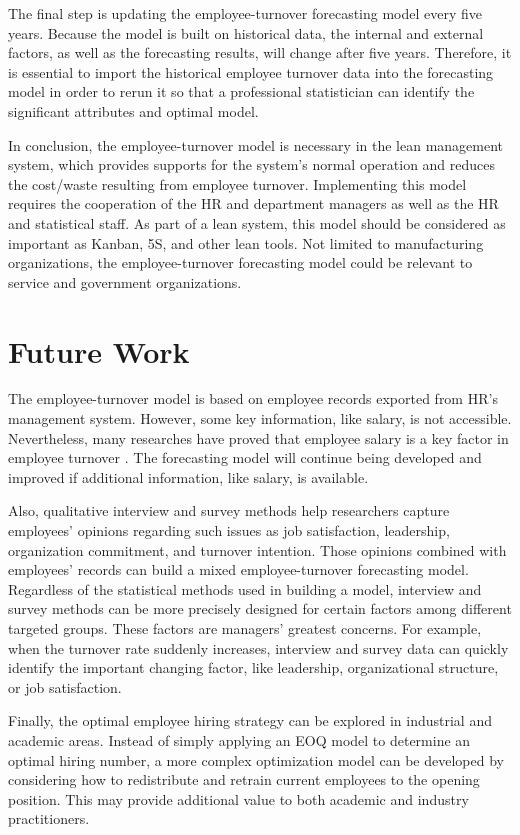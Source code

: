 The final step is updating the employee-turnover forecasting model every five years. Because the model is built on historical data, the internal and external factors, as well as the forecasting results, will change after five years. Therefore, it is essential to import the historical employee turnover data into the forecasting model in order to rerun it so that a professional statistician can identify the significant attributes and optimal model.

In conclusion, the employee-turnover model is necessary in the lean management system, which provides supports for the system's normal operation and reduces the cost/waste resulting from employee turnover. Implementing this model requires the cooperation of the HR and department managers as well as the HR and statistical staff. As part of a lean system, this model should be considered as important as Kanban, 5S, and other lean tools.  Not limited to manufacturing organizations, the employee-turnover forecasting model could be relevant to service and government organizations. 

\section{Future Work}
The employee-turnover model is based on employee records exported from HR's management system. However, some key information, like salary, is not accessible. Nevertheless, many researches have proved that employee salary is a key factor in employee turnover \citep{griffeth2000}. The forecasting model will continue being developed and improved if additional information, like salary, is available. 

Also, qualitative interview and survey methods help researchers capture employees' opinions regarding such issues as job satisfaction, leadership, organization commitment, and turnover intention. Those opinions combined with employees' records can build a mixed employee-turnover forecasting model. Regardless of the statistical methods used in building a model, interview and survey methods can be more precisely designed for certain factors among different targeted groups. These factors are managers' greatest concerns. For example, when the turnover rate suddenly increases, interview and survey data can quickly identify the important changing factor, like leadership, organizational structure, or job satisfaction. 

Finally, the optimal employee hiring strategy can be explored in industrial and academic areas. Instead of simply applying an EOQ model to determine an optimal hiring number, a more complex optimization model can be developed by considering how to redistribute and retrain current employees to the opening position. This may provide additional value to both academic and industry practitioners.


